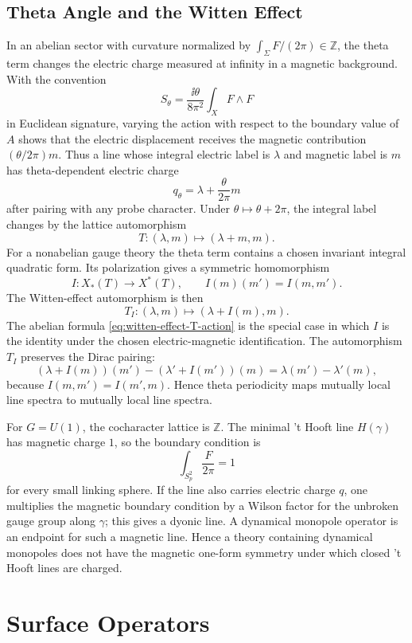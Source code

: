 \subsection{Theta Angle and the Witten Effect}

In an abelian sector with curvature normalized by
\(\int_{\Sigma}F/(2\pi)\in\mathbb Z\), the theta term changes the electric
charge measured at infinity in a magnetic background.  With the convention
\[
  S_\theta=\frac{\ii\theta}{8\pi^2}\int_X F\wedge F
\]
in Euclidean signature, varying the action with respect to the boundary value
of \(A\) shows that the electric displacement receives the magnetic
contribution \((\theta/2\pi)m\).  Thus a line whose integral electric label
is \(\lambda\) and magnetic label is \(m\) has theta-dependent electric
charge
\[
  q_\theta=\lambda+\frac{\theta}{2\pi}m
\]
after pairing with any probe character.  Under \(\theta\mapsto\theta+2\pi\),
the integral label changes by the lattice automorphism
\begin{equation}
  T:(\lambda,m)\longmapsto(\lambda+m,m).
  \label{eq:witten-effect-T-action}
\end{equation}
For a nonabelian gauge theory the theta term contains a chosen invariant
integral quadratic form.  Its polarization gives a symmetric homomorphism
\[
  I:X_*(T)\longrightarrow X^*(T),
  \qquad
  I(m)(m')=I(m,m') .
\]
The Witten-effect automorphism is then
\[
  T_I:(\lambda,m)\longmapsto(\lambda+I(m),m).
\]
The abelian formula \eqref{eq:witten-effect-T-action} is the special case in
which \(I\) is the identity under the chosen electric-magnetic
identification.  The automorphism \(T_I\) preserves the Dirac pairing:
\[
  (\lambda+I(m))(m')-(\lambda'+I(m'))(m)
  =
  \lambda(m')-\lambda'(m),
\]
because \(I(m,m')=I(m',m)\).  Hence theta periodicity maps mutually local
line spectra to mutually local line spectra.

For \(G=U(1)\), the cocharacter lattice is \(\mathbb Z\).  The minimal
't Hooft line \(H(\gamma)\) has magnetic charge \(1\), so the boundary
condition is
\[
  \int_{S^2_p}\frac{F}{2\pi}=1
\]
for every small linking sphere.  If the line also carries electric charge
\(q\), one multiplies the magnetic boundary condition by a Wilson factor for
the unbroken gauge group along \(\gamma\); this gives a dyonic line.  A
dynamical monopole operator is an endpoint for such a magnetic line.  Hence a
theory containing dynamical monopoles does not have the magnetic one-form
symmetry under which closed 't Hooft lines are charged.

\section{Surface Operators}

